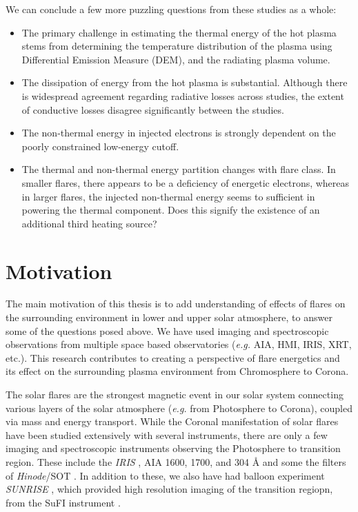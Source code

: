 We can conclude a few more puzzling questions from these studies as a whole:

\begin{itemize}
    \item The primary challenge in estimating the thermal energy of the hot plasma stems from determining the temperature distribution of the plasma using Differential Emission Measure (DEM), and the radiating plasma volume.
    \item The dissipation of energy from the hot plasma is substantial. Although there is widespread agreement regarding radiative losses across studies, the extent of conductive losses disagree significantly between the studies.
    \item The non-thermal energy in injected electrons is strongly dependent on the poorly constrained low-energy cutoff.
    \item The thermal and non-thermal energy partition changes with flare class. In smaller flares, there appears to be a deficiency of energetic electrons, whereas in larger flares, the injected non-thermal energy seems to sufficient in powering the thermal component. Does this signify the existence of an additional third heating source?
\end{itemize}


\section{Motivation}\label{sec:mot}

The main motivation of this thesis is to add understanding of effects of flares on the surrounding environment in lower and upper solar atmosphere, to answer some of the questions posed above. We have used imaging and spectroscopic observations from multiple space based observatories ({\it e.g.} AIA, HMI, IRIS, XRT, etc.). This research contributes to creating a perspective of flare energetics and its effect on the surrounding plasma environment from Chromosphere to Corona.

The solar flares are the strongest magnetic event in our solar system connecting various layers of the solar atmosphere ({\it e.g.} from Photosphere to Corona), coupled via mass and energy transport. While the Coronal manifestation of solar flares have been studied extensively with several instruments, there are only a few imaging and spectroscopic instruments observing the Photosphere to transition region. These include the {\it IRIS} \citep{iris}, AIA 1600, 1700, and 304  {\AA} \citep{aia} and some the filters of {\it Hinode}/SOT \citep{sot}. In addition to these, we also have had balloon experiment {\it SUNRISE} \citep{sunrise1,sunrise2}, which provided high resolution imaging of the transition regiopn, from the SuFI instrument \citep{sufi}.

